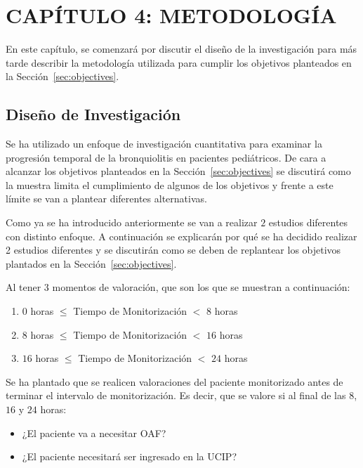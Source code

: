 \section{CAPÍTULO 4: METODOLOGÍA}\label{cap:methodology}

En este capítulo, se comenzará por discutir el diseño de la investigación para más tarde describir la metodología utilizada para cumplir los objetivos planteados en la Sección~\ref{sec:objectives}. 

\subsection{Diseño de Investigación}

Se ha utilizado un enfoque de investigación cuantitativa para examinar la progresión temporal de la bronquiolitis en pacientes pediátricos. De cara a alcanzar los objetivos planteados en la Sección~\ref{sec:objectives} se discutirá como la muestra limita el cumplimiento de algunos de los objetivos y frente a este límite se van a plantear diferentes alternativas. 

Como ya se ha introducido anteriormente se van a realizar $2$ estudios diferentes con distinto enfoque. A continuación se explicarán por qué se ha decidido realizar 2 estudios diferentes y se discutirán como se deben de replantear los objetivos plantados en la Sección~\ref{sec:objectives}.

Al tener 3 momentos de valoración, que son los que se muestran a continuación:

\begin{enumerate}
    \item $0$ horas $\leq$ Tiempo de Monitorización $<$ $8$ horas 
    \item $8$ horas $\leq$ Tiempo de Monitorización $<$ $16$ horas
    \item $16$ horas $\leq$ Tiempo de Monitorización $<$ $24$ horas
\end{enumerate}


Se ha plantado que se realicen valoraciones del paciente monitorizado antes de terminar el intervalo de monitorización. Es decir, que se valore si al final de las $8$, $16$ y $24$ horas: 

\begin{itemize}
    \item ¿El paciente va a necesitar OAF?
    \item ¿El paciente necesitará ser ingresado en la UCIP?
\end{itemize}

